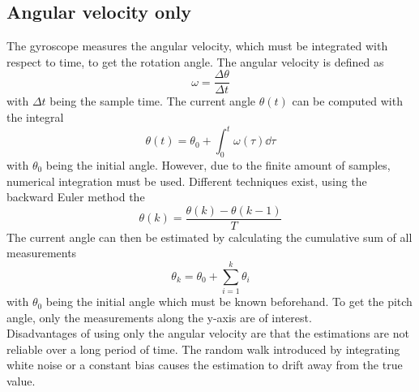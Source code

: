 \subsection{Angular velocity only}
The gyroscope measures the angular velocity, which must be integrated with respect to time, to get the rotation angle.
The angular velocity is defined as
\begin{equation}
	\omega = \frac{\Delta\theta}{\Delta t}
\end{equation}
with $\Delta t$ being the sample time.
The current angle $\theta(t)$ can be computed with the integral
\begin{equation}
	\theta(t) = \theta_0 + \int_0^t \omega(\tau)\dd{\tau}
\end{equation}
with $\theta_0$ being the initial angle.
However, due to the finite amount of samples, numerical integration must be used.
Different techniques exist, using the backward Euler method the
\begin{equation}
	\theta(k) = \frac{\theta(k) - \theta(k - 1)}{T}
\end{equation}
The current angle can then be estimated by calculating the cumulative sum of all measurements
\begin{equation}
	\theta_k = \theta_0 + \sum_{i = 1}^k \theta_i
\end{equation}
with $\theta_0$ being the initial angle which must be known beforehand.
To get the pitch angle, only the measurements along the y-axis are of interest.\\
Disadvantages of using only the angular velocity are that the estimations are not reliable over a long period of time.
The random walk introduced by integrating white noise or a constant bias causes the estimation to drift away from the true value.


